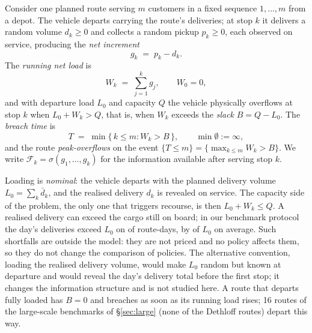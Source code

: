 \documentclass[preprint,authoryear,12pt]{elsarticle}
\theoremstyle{definition}
\theoremstyle{remark}
\begin{document}
Consider one planned route serving $m$ customers in a fixed sequence
$1,\dots,m$ from a depot. The vehicle departs carrying the route's
deliveries; at stop $k$ it delivers a random volume $d_k \ge 0$ and
collects a random pickup $p_k \ge 0$, each observed on service,
producing the \emph{net increment}
\begin{equation}\label{eq:increment}
  g_k \;=\; p_k - d_k .
\end{equation}
The \emph{running net load} is
\begin{equation}\label{eq:runsum}
  W_k \;=\; \sum_{j=1}^{k} g_j , \qquad W_0 = 0 ,
\end{equation}
and with departure load $L_0$ and capacity $Q$ the vehicle physically
overflows at stop $k$ when $L_0 + W_k > Q$, that is, when $W_k$ exceeds
the \emph{slack} $B = Q - L_0$. The \emph{breach time} is
\begin{equation}\label{eq:breach}
  T \;=\; \min\{\,k \le m : W_k > B\,\}, \qquad \min\emptyset := \infty ,
\end{equation}
and the route \emph{peak-overflows} on the event
$\{T \le m\} = \{\max_{k\le m} W_k > B\}$. We write
$\mathcal F_k = \sigma(g_1,\dots,g_k)$ for the information available
after serving stop $k$.

Loading is \emph{nominal}: the vehicle departs with the planned
delivery volume $L_0 = \sum_k \bar d_k$, and the realised
delivery $d_k$ is revealed on service. The capacity side of the problem,
the only one that triggers recourse, is then $L_0 + W_k \le Q$. A
realised delivery can exceed the cargo still on board; in our benchmark
protocol the day's deliveries exceed $L_0$ on \stockoutAll{} of
route-days, by \stockoutExcess{} of $L_0$ on average. Such shortfalls are
outside the model: they are not priced and no policy affects them, so
they do not change the comparison of policies. The alternative
convention, loading the realised delivery volume, would make $L_0$
random but known at departure and would reveal the day's delivery total
before the first stop; it changes the information structure and is not
studied here. A route that departs fully loaded has $B = 0$ and
breaches as soon as its running load rises; 16 routes of the
large-scale benchmarks of \S\ref{sec:large} (none of the Dethloff
routes) depart this way.
\end{document}
